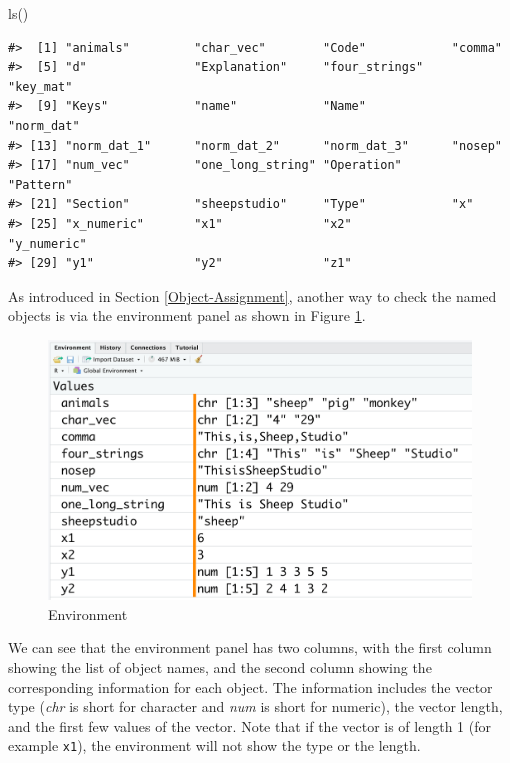 \documentclass[
]{book}
\newenvironment{Shaded}{\begin{snugshade}}{\end{snugshade}}
\newcommand{\FunctionTok}[1]{\textcolor[rgb]{0.00,0.00,0.00}{#1}}
\newcommand{\NormalTok}[1]{#1}
\begin{document}
\begin{Shaded}
\begin{Highlighting}[]
\FunctionTok{ls}\NormalTok{()}
\end{Highlighting}
\end{Shaded}

\begin{verbatim}
#>  [1] "animals"         "char_vec"        "Code"            "comma"          
#>  [5] "d"               "Explanation"     "four_strings"    "key_mat"        
#>  [9] "Keys"            "name"            "Name"            "norm_dat"       
#> [13] "norm_dat_1"      "norm_dat_2"      "norm_dat_3"      "nosep"          
#> [17] "num_vec"         "one_long_string" "Operation"       "Pattern"        
#> [21] "Section"         "sheepstudio"     "Type"            "x"              
#> [25] "x_numeric"       "x1"              "x2"              "y_numeric"      
#> [29] "y1"              "y2"              "z1"
\end{verbatim}

As introduced in Section \ref{Object-Assignment}, another way to check the named objects is via the environment panel as shown in Figure \ref{fig:enviro}.

\begin{figure}

{\centering \includegraphics[width=0.7\linewidth]{pics/2enviro} 

}

\caption{Environment}\label{fig:enviro}
\end{figure}

We can see that the environment panel has two columns, with the first column showing the list of object names, and the second column showing the corresponding information for each object. The information includes the vector type (\emph{chr} is short for character and \emph{num} is short for numeric), the vector length, and the first few values of the vector. Note that if the vector is of length 1 (for example \texttt{x1}), the environment will not show the type or the length.
\end{document}
